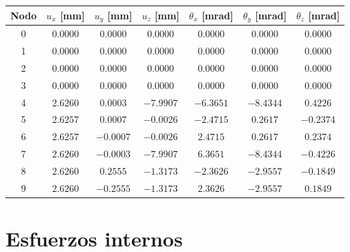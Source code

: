 \documentclass[11pt,a4paper]{article}
\begin{document}
\begin{center}
\begin{minipage}{\linewidth}
\centering
{}\label{tab:viga3d-desplazamientos}
\begin{tabular}{@{}ccccccc@{}}
\toprule
Nodo & $u_x$ [mm] & $u_y$ [mm] & $u_z$ [mm] & $\theta_x$ [mrad] & $\theta_y$ [mrad] & $\theta_z$ [mrad] \\
\midrule
0 & $0.0000$ & $0.0000$ & $0.0000$ & $0.0000$ & $0.0000$ & $0.0000$ \\
1 & $0.0000$ & $0.0000$ & $0.0000$ & $0.0000$ & $0.0000$ & $0.0000$ \\
2 & $0.0000$ & $0.0000$ & $0.0000$ & $0.0000$ & $0.0000$ & $0.0000$ \\
3 & $0.0000$ & $0.0000$ & $0.0000$ & $0.0000$ & $0.0000$ & $0.0000$ \\
4 & $2.6260$ & $0.0003$ & $-7.9907$ & $-6.3651$ & $-8.4344$ & $0.4226$ \\
5 & $2.6257$ & $0.0007$ & $-0.0026$ & $-2.4715$ & $0.2617$ & $-0.2374$ \\
6 & $2.6257$ & $-0.0007$ & $-0.0026$ & $2.4715$ & $0.2617$ & $0.2374$ \\
7 & $2.6260$ & $-0.0003$ & $-7.9907$ & $6.3651$ & $-8.4344$ & $-0.4226$ \\
8 & $2.6260$ & $0.2555$ & $-1.3173$ & $-2.3626$ & $-2.9557$ & $-0.1849$ \\
9 & $2.6260$ & $-0.2555$ & $-1.3173$ & $2.3626$ & $-2.9557$ & $0.1849$ \\
\bottomrule
\end{tabular}
\end{minipage}
\end{center}

\section{Esfuerzos internos}
\end{document}
